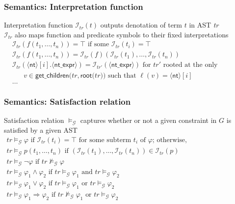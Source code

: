 \documentclass[11pt,xcolor={dvipsnames},hyperref={pdftex,pdfpagemode=UseNone,hidelinks,pdfdisplaydoctitle=true},usepdftitle=false]{beamer}
\newcommand{\nt}[1]{\langle \mathsf{#1} \rangle}
\newcommand{\blue}[1]{\textcolor{blue!70!black}{#1}}
\begin{document}
\begin{frame}
    \frametitle{Semantics: Interpretation function}
Interpretation function \blue{$\mathcal{I}_{\mathit{tr}}(t)$} outputs denotation 
of term \blue{$t$} in AST \blue{\emph{tr}} \\[4pt]

\blue{$\mathcal{I}_{tr}$} also maps function and predicate symbols 
to their fixed interpretations\\[4pt]

\blue{{\small\noindent$
\begin{array}{ll} 
&\mathcal{I}_{tr}(f(t_1, \dots, t_n)) = \top \text{ if some } \mathcal{I}_{tr}(t_i) = \top  \\
&\mathcal{I}_{tr}(f(t_1, \dots, t_n)) = \mathcal{I}_{tr}(f)(\mathcal{I}_{tr}(t_1), \dots, \mathcal{I}_{tr}(t_n)) \\
&\mathcal{I}_{tr}(\nt{nt}[i].\nt{nt\_expr}) = \mathcal{I}_{tr'}(\nt{nt\_expr}) \text{ for } \mathit{tr}' \text{ rooted at the only } \\
    &\;\;\;\;\;\;v \in \mathsf{get\_children(\mathit{tr}, root(}\mathit{tr})) \text{ such that } \ell(v) = \nt{nt}[i] \\
    &\dots
\end{array}
$}}
\end{frame} 

\begin{frame} 
    \frametitle{Semantics: Satisfaction relation}
Satisfaction relation \blue{$\models_{\mathcal{G}}$} captures whether or not a given constraint in \blue{$G$}
is satisfied by a given AST\\[4pt] 

\blue{
  \(
\begin{array}{l}
    \mathit{tr} \models_{\mathcal{G}} \varphi \text{ if } \mathcal{I}_{\mathit{tr}}(t_i) = \top \text{ for some subterm } t_i \text{ of } \varphi \text{; otherwise,} \\
    \mathit{tr} \models_{\mathcal{G}} p(t_1, \dots, t_n) \text{ if } (\mathcal{I}_{tr}(t_1), \dots, \mathcal{I}_{tr}(t_n)) \in \mathcal{I}_{tr}(p) \\
    \mathit{tr} \models_{\mathcal{G}} \neg \varphi \text{ if } \mathit{tr} \not\models_{\mathcal{G}} \varphi \\
    \mathit{tr} \models_{\mathcal{G}} \varphi_1 \land \varphi_2 \text{ if } \mathit{tr} \models_{\mathcal{G}} \varphi_1 \text{ and } \mathit{tr} \models_{\mathcal{G}} \varphi_2 \\
    \mathit{tr} \models_{\mathcal{G}} \varphi_1 \lor \varphi_2 \text{ if } \mathit{tr} \models_{\mathcal{G}} \varphi_1 \text{ or } \mathit{tr} \models_{\mathcal{G}} \varphi_2 \\
    \mathit{tr} \models_{\mathcal{G}} \varphi_1 \Rightarrow \varphi_2 \text{ if } \mathit{tr} \not\models_{\mathcal{G}} \varphi_1 \text{ or } \mathit{tr} \models_{\mathcal{G}} \varphi_2 \\
\end{array}
\)}
\end{frame}
\end{document}
